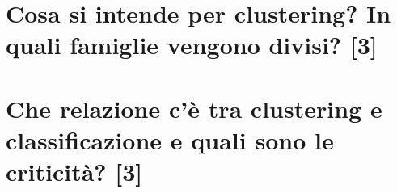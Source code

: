 \documentclass[\main/main.tex]{subfiles}
\begin{document}
\section{Cosa si intende per clustering? In quali famiglie vengono divisi? [3]}
\section{Che relazione c'è tra clustering e classificazione e quali sono le criticità? [3]}
\end{document}
